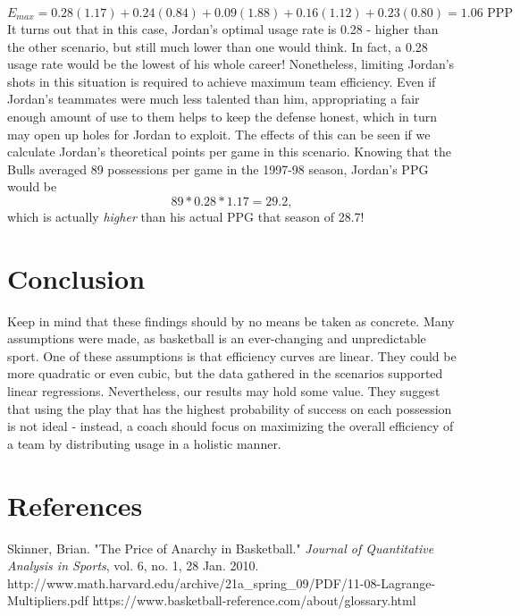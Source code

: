 \documentclass{article}
\begin{document}
\newline $$E_{max}=0.28(1.17)+0.24(0.84)+0.09(1.88)+0.16(1.12)+0.23(0.80)=1.06 \text{ PPP}$$
It turns out that in this case, Jordan's optimal usage rate is 0.28 - higher than the other scenario, but still much lower than one would think. In fact, a 0.28 usage rate would be the lowest of his whole career! Nonetheless, limiting Jordan's shots in this situation is required to achieve maximum team efficiency. Even if Jordan's teammates were much less talented than him, appropriating a fair enough amount of use to them helps to keep the defense honest, which in turn may open up holes for Jordan to exploit. The effects of this can be seen if we calculate Jordan's theoretical points per game in this scenario. Knowing that the Bulls averaged 89 possessions per game in the 1997-98 season, Jordan's PPG would be
$$89 * 0.28 * 1.17 = 29.2,$$ which is actually \textit{higher} than his actual PPG that season of 28.7!
\section*{Conclusion}
Keep in mind that these findings should by no means be taken as concrete. Many assumptions were made, as basketball is an ever-changing and unpredictable sport. One of these assumptions is that efficiency curves are linear. They could be more quadratic or even cubic, but the data gathered in the scenarios supported linear regressions. Nevertheless, our results may hold some value. They suggest that using the play that has the highest probability of success on each possession is not ideal - instead, a coach should focus on maximizing the overall efficiency of a team by distributing usage in a holistic manner.
\section*{References}
Skinner, Brian. "The Price of Anarchy in Basketball." \textit{Journal of Quantitative Analysis in Sports}, 
     vol. 6, no. 1, 28 Jan. 2010. 
\newline http://www.math.harvard.edu/archive/21a\_spring\_09/PDF/11-08-Lagrange-Multipliers.pdf
\newline https://www.basketball-reference.com/about/glossary.html
\end{document}
